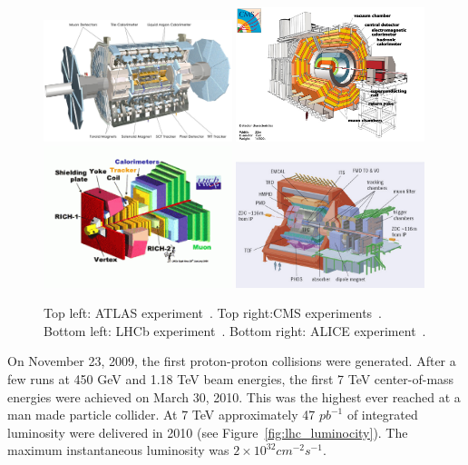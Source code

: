 \begin{figure}[htb]
\centering
\includegraphics[width=0.49\textwidth]{Experiment/atlas.jpg}
\includegraphics[width=0.49\textwidth]{Experiment/cms.jpg}
\includegraphics[width=0.49\textwidth]{Experiment/LHCb.png}
\includegraphics[width=0.49\textwidth]{Experiment/alice.jpg}
\caption{Top left: ATLAS experiment~\cite{ATLAS_image}. Top right:CMS experiments~\cite{CMS_image}. Bottom left: LHCb experiment~\cite{lhcb_image}. Bottom right: ALICE experiment~\cite{ALICE_image}.}
\label{fig:lhc_experiments}
\end{figure}




On November 23, 2009, the first proton-proton collisions were generated.  After a few runs at 450 GeV and 1.18 TeV beam energies, the first 7 TeV center-of-mass energies were achieved on March 30, 2010. This was the highest ever reached at a man made particle collider.  At 7 TeV approximately 47 $pb^{-1}$ of integrated luminosity were delivered in 2010 (see Figure~\ref{fig:lhc_luminocity}). The maximum instantaneous luminosity was $2 \times 10^{32} cm^{-2}s^{-1}$.

